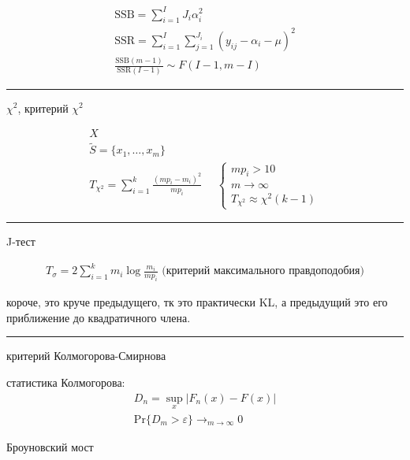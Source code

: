 \documentclass{book}
\begin{document}
\begin{gather*}
  \mathrm{SSB}=\sum_{i=1}^{I} {J_i\alpha_i^2}\\
  \mathrm{SSR}=\sum_{i=1}^{I} \sum_{j=1}^{J_i} {(y_{ij}-\alpha_i-\mu)^2}\\
  \frac{\mathrm{SSB}(m-1)}{\mathrm{SSR}(I-1)} \sim F(I-1, m-I)
\end{gather*}


\hrule

$\chi^2$, критерий $\chi^2$

\begin{gather*}
  X\\
  \tilde{S}=\{x_1, \dots, x_m\}\\
  T_{\chi^2}=\sum_{i=1}^{k} {\frac{(mp_i-m_i)^2}{mp_i}}
  ~~~~~~
  \begin{cases}
      mp_i > 10\\
      m\rightarrow\infty\\
      T_{\chi^2} \approx \chi^2(k-1)
  \end{cases}
\end{gather*}

\hrule

J-тест

\begin{gather*}
  T_{\sigma}=2 \sum_{i=1}^{k} {m_i\log \frac{m_i}{mp_i}}\textrm{ (критерий максимального правдоподобия)}
\end{gather*}

короче, это круче предыдущего, тк это практически KL, а предыдущий это его приближение до квадратичного члена.

\hrule

критерий Колмогорова-Смирнова

статистика Колмогорова:
\begin{gather*}
    D_n=\sup_x |F_n(x)-F(x)|\\
    \mathrm{Pr}\{D_m>\varepsilon\} \rightarrow_{m\rightarrow\infty} 0
\end{gather*}


Броуновский мост
\end{document}
